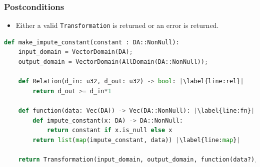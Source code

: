 \documentclass[11pt,a4paper]{article}
\newcommand{\grace}[1]{{ {\color{purple}{(grace)~#1}}}}
\begin{document}
\subsubsection*{Postconditions}

\begin{itemize}
    \item Either a valid \texttt{Transformation} is returned or an error is returned.
\end{itemize}

\grace{Not sure if I need to include the error check for whether the constant is nonnull in line 69 code. Is it already checked? }
\begin{lstlisting}[language=Python,  escapechar=|]
def make_impute_constant(constant : DA::NonNull):
    input_domain = VectorDomain(DA);
    output_domain = VectorDomain(AllDomain(DA::NonNull));
    
    def Relation(d_in: u32, d_out: u32) -> bool: |\label{line:rel}|
        return d_out >= d_in*1

    def function(data: Vec(DA)) -> Vec(DA::NonNull): |\label{line:fn}|
        def impute_constant(x: DA) -> DA::NonNull:
            return constant if x.is_null else x
        return list(map(impute_constant, data)) |\label{line:map}|
        
    return Transformation(input_domain, output_domain, function(data?), input_metric, output_metric, stability_relation=Relation)

\end{lstlisting}

\grace{ Will need to change pseudocode so that it returns the result of a make row by row transformation (which the code does) instead of a Transformation directly. Make sure to ask.}
\end{document}
